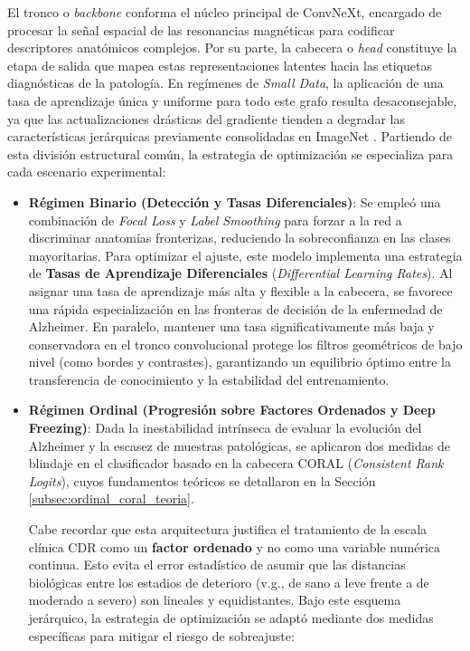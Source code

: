\documentclass[12pt, oneside, english, spanish]{book}
\begin{document}
El tronco o \textit{backbone} conforma el núcleo principal de ConvNeXt, encargado de procesar la señal espacial de las resonancias magnéticas para codificar descriptores anatómicos complejos. Por su parte, la cabecera o \textit{head} constituye la etapa de salida que mapea estas representaciones latentes hacia las etiquetas diagnósticas de la patología. En regímenes de \textit{Small Data}, la aplicación de una tasa de aprendizaje única y uniforme para todo este grafo resulta desaconsejable, ya que las actualizaciones drásticas del gradiente tienden a degradar las características jerárquicas previamente consolidadas en ImageNet \cite{liu2022convnet}. Partiendo de esta división estructural común, la estrategia de optimización se especializa para cada escenario experimental:

\begin{itemize}
	\item \textbf{Régimen Binario (Detección y Tasas Diferenciales)}: 
	Se empleó una combinación de \textit{Focal Loss} y \textit{Label Smoothing} para forzar a la red a discriminar anatomías fronterizas, reduciendo la sobreconfianza en las clases mayoritarias. Para optimizar el ajuste, este modelo implementa una estrategia de \textbf{Tasas de Aprendizaje Diferenciales} (\textit{Differential Learning Rates}). Al asignar una tasa de aprendizaje más alta y flexible a la cabecera, se favorece una rápida especialización en las fronteras de decisión de la enfermedad de Alzheimer. En paralelo, mantener una tasa significativamente más baja y conservadora en el tronco convolucional protege los filtros geométricos de bajo nivel (como bordes y contrastes), garantizando un equilibrio óptimo entre la transferencia de conocimiento y la estabilidad del entrenamiento.
	
	\item \textbf{Régimen Ordinal (Progresión sobre Factores Ordenados y Deep Freezing)}: 
	Dada la inestabilidad intrínseca de evaluar la evolución del Alzheimer y la escasez de muestras patológicas, se aplicaron dos medidas de blindaje en el clasificador basado en la cabecera CORAL (\textit{Consistent Rank Logits}), cuyos fundamentos teóricos se detallaron en la Sección \ref{subsec:ordinal_coral_teoria}. 
	
	Cabe recordar que esta arquitectura justifica el tratamiento de la escala clínica CDR como un \textbf{factor ordenado} y no como una variable numérica continua. Esto evita el error estadístico de asumir que las distancias biológicas entre los estadios de deterioro (v.g., de sano a leve frente a de moderado a severo) son lineales y equidistantes. Bajo este esquema jerárquico, la estrategia de optimización se adaptó mediante dos medidas específicas para mitigar el riesgo de sobreajuste:
	

\end{itemize}
\end{document}
